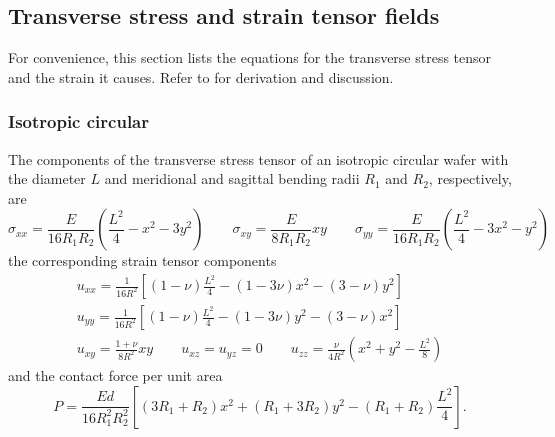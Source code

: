\documentclass[11pt,a4paper]{article}
\begin{document}
\subsection{Transverse stress and strain tensor fields}
For convenience, this section lists the equations for the transverse stress tensor and the strain it causes. Refer to \cite{honkanen2020} for derivation and discussion.
\subsubsection{Isotropic circular}
The components of the transverse stress tensor of an isotropic circular wafer with the diameter $L$ and meridional and sagittal bending radii $R_1$ and $R_2$, respectively, are
\begin{equation}
\sigma_{xx} =  \frac{E}{16 R_1 R_2}\left( \frac{L^2}{4} - x^2 - 3 y^2 \right) \qquad
\sigma_{xy} = \frac{E}{8 R_1 R_2}x y \qquad
\sigma_{yy} =  \frac{E}{16 R_1 R_2}\left(\frac{L^2}{4} - 3 x^2 - y^2\right)
\end{equation}
the corresponding strain tensor components
\begin{gather}
u_{xx} = \frac{1}{16 R^2}\left[(1-\nu)\frac{L^2}{4} - (1-3\nu)x^2 - (3-\nu)y^2 \right] \\
u_{yy} = \frac{1}{16 R^2}\left[(1-\nu)\frac{L^2}{4} - (1-3\nu)y^2 - (3-\nu)x^2 \right] \\
u_{xy} = \frac{1+\nu}{8 R^2}x y \qquad u_{xz} = u_{yz} = 0 \qquad
u_{zz} = \frac{\nu}{4R^2}\left(x^2 + y^2 -\frac{L^2}{8} \right)
\end{gather}
and the contact force per unit area
\begin{equation}
P = \frac{E d}{16 R_1^2 R_2^2} \left[ 
\left(3 R_1 + R_2 \right) x^2
+ \left(R_1 + 3 R_2 \right) y^2
- \left(R_1 + R_2 \right)\frac{L^2}{4}
\right].
\end{equation}



\end{document}

